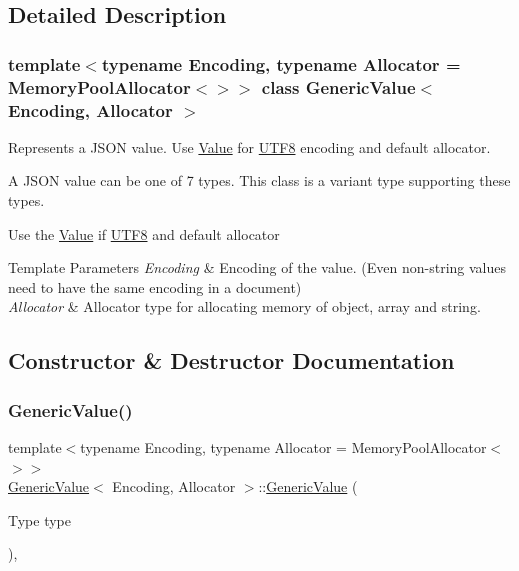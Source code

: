 \subsection{Detailed Description}
\subsubsection*{template$<$typename Encoding, typename Allocator = Memory\+Pool\+Allocator$<$$>$$>$\newline
class Generic\+Value$<$ Encoding, Allocator $>$}

Represents a J\+S\+ON value. Use \hyperlink{classValue}{Value} for \hyperlink{structUTF8}{U\+T\+F8} encoding and default allocator. 

A J\+S\+ON value can be one of 7 types. This class is a variant type supporting these types.

Use the \hyperlink{classValue}{Value} if \hyperlink{structUTF8}{U\+T\+F8} and default allocator


\begin{DoxyTemplParams}{Template Parameters}
{\em Encoding} & Encoding of the value. (Even non-\/string values need to have the same encoding in a document) \\
\hline
{\em Allocator} & Allocator type for allocating memory of object, array and string. \\
\hline
\end{DoxyTemplParams}


\subsection{Constructor \& Destructor Documentation}
\mbox{\label{classGenericValue_a83c8f84b8e61f2f40414b703b75aea61}} 
\subsubsection{\texorpdfstring{Generic\+Value()}{GenericValue()}\hspace{0.1cm}{\footnotesize\ttfamily [1/8]}}
{\footnotesize\ttfamily template$<$typename Encoding, typename Allocator = Memory\+Pool\+Allocator$<$$>$$>$ \\
\hyperlink{classGenericValue}{Generic\+Value}$<$ Encoding, Allocator $>$\+::\hyperlink{classGenericValue}{Generic\+Value} (\begin{DoxyParamCaption}\item[{Type}]{type }\end{DoxyParamCaption})\hspace{0.3cm}{\ttfamily [inline]}, {\ttfamily [explicit]}}



